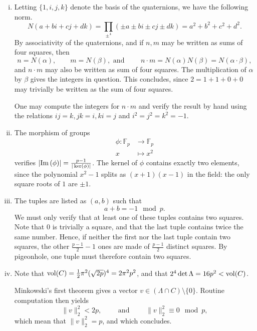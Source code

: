 \documentclass[12pt,a4paper]{article}
\theoremstyle{plain}
\theoremstyle{definition}
\def \F {\mathbb F}
\def \Im {{\rm Im}\,}
\begin{document}
{
	\begin{enumerate}[i)]
		\item Letting $\{1, i, j, k\}$ denote the basis of the quaternions, we have the following norm.
			\[ N(a + bi + cj + dk) = \prod_{\pm^4} (\pm a \pm bi \pm cj \pm dk) = a^2 + b^2 + c^2 + d^2. \]
		By associativity of the quaternions, and if $n, m$ may be written as sums of four squares, then
			\[ n = N(\alpha), \qquad m = N(\beta), \text{ and } \qquad n\cdot m = N(\alpha) N(\beta) = N(\alpha \cdot \beta), \]
		and $n \cdot m$ may also be written as sum of four squares.
		The multiplication of $\alpha$ by $\beta$ gives the integers in question.
		This concludes, since $2 = 1 + 1 + 0 + 0$ may trivially be written as the sum of four squares. 

		One may compute the integers for $n \cdot m$ and verify the result by hand using the relations $ij = k, jk = i, ki = j$ and $i^2 = j^2 = k^2 = -1$.


		\item The morphism of groups
			\begin{align*}
				\phi : \F_p &\rightarrow \F_p \\
					x &\mapsto x^2
			\end{align*}
		verifies $|\Im(\phi)| = \frac{p-1}{| \ker(\phi)|}$.
		The kernel of $\phi$ contains exactly two elements, since the polynomial $x^2 - 1$ splits as $(x+1)(x-1)$ in the field: the only square roots of $1$ are $\pm1$.

		\item The tuples are listed as $(a, b)$ such that
			\[ a + b = -1 \mod{p}. \]
		We must only verify that at least one of these tuples contains two squares.
		Note that $0$ is trivially a square, and that the last tuple contains twice the same number.
		Hence, if neither the first nor the last tuple contain two squares, the other $\frac{p-1}2 - 1$ ones are made of $\frac{p-1}2$ distinct squares. 
		 By pigeonhole, one tuple must therefore contain two squares.

		\item Note that ${\rm vol}(C) = \frac12 \pi^2 (\sqrt{2p})^4 = 2 \pi^2 p^2$, and that $2^4 \det \Lambda = 16p^2 < {\rm vol}(C)$.

		Minkowski's first theorem gives a vector $v \in \left( \Lambda \cap C \right) \setminus \{0\}$.
		Routine computation then yields
			\[ \| v \|_2^2 < 2p, \qquad \text { and } \qquad  \| v \|_2^2  \equiv 0 \mod{p}, \]
		which mean that $\| v \|_2^2  = p$, and which concludes.
		
	\end{enumerate}

}
\end{document}
